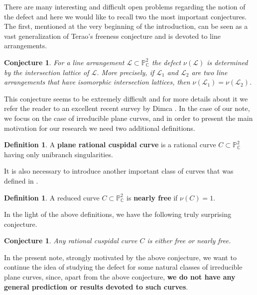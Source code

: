 \documentclass[12pt]{article}
\theoremstyle{plain}
\newtheorem{conjecture}[thm]{Conjecture}
\theoremstyle{definition}
\newtheorem{definition}[thm]{Definition}
\begin{document}
There are many interesting and difficult open problems regarding the notion of the defect and here we would like to recall two the most important conjectures. The first, mentioned at the very beginning of the introduction, can be seen as a vast generalization of Terao's freeness conjecture and is devoted to line arrangements.
\begin{conjecture}
For a line arrangement $\mathcal{L} \subset \mathbb{P}^{2}_{\mathbb{C}}$ the defect $\nu(\mathcal{L})$ is determined by the intersection lattice of $\mathcal{L}$. More precisely, if $\mathcal{L}_{1}$ and $\mathcal{L}_{2}$ are two line arrangements that have isomorphic intersection lattices, then $\nu(\mathcal{L}_{1}) = \nu(\mathcal{L}_{2})$.
\end{conjecture}
This conjecture seems to be extremely difficult and for more details about it we refer the reader to an excellent recent survey by Dimca \cite{SurDim}. In the case of our note, we focus on the case of irreducible plane curves, and in order to present the main motivation for our research we need two additional definitions.
\begin{definition}
 A \textbf{plane rational cuspidal curve} is a rational curve $C \subset \mathbb{P}^{2}_{\mathbb{C}}$ having only unibranch singularities.   
\end{definition}
It is also necessary to introduce another important class of curves that was defined in \cite{DimStic}.
\begin{definition}
A reduced curve $C \subset \mathbb{P}^{2}_{\mathbb{C}}$ is \textbf{nearly free} if $\nu(C) = 1$.
\end{definition}
In the light of the above definitions, we have the following truly surprising conjecture.
\begin{conjecture}
Any rational cuspidal curve $C$ is either free or nearly free.
\end{conjecture}
In the present note, strongly motivated by the above conjecture, we want to continue the idea of studying the defect for some natural classes of irreducible plane curves, since, apart from the above conjecture, \textbf{we do not have any general prediction or results devoted to such curves}.
\end{document}
